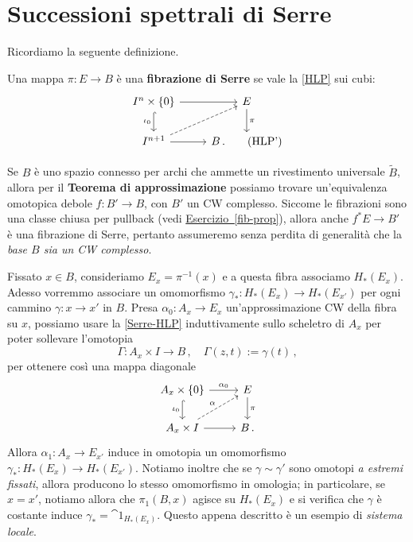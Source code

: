 \section{Successioni spettrali di Serre}

Ricordiamo la seguente definizione.

\begin{df}
	Una mappa $\pi : E \to B$ è una \textbf{fibrazione di Serre} se
	vale la \eqref{HLP} sui cubi:
	\begin{equation}\label{Serre-HLP}
		\begin{tikzcd}
			I^{n} \times \{0\} \ar[r] \ar[d, "\iota_{0}"', hook] & E \ar[d, "\pi"] \\
			I^{n+1} \ar[r] \ar[ur, dashed] & B\,. \tag{HLP'}
		\end{tikzcd}
	\end{equation}
\end{df}

Se $B$ è uno spazio connesso per archi che ammette un rivestimento universale $\widetilde{B}$,
allora per il \textbf{Teorema di approssimazione} possiamo trovare un'equivalenza
omotopica debole $f: B' \to B$, con $B'$ un CW complesso. Siccome le fibrazioni
sono una classe chiusa per pullback (vedi \hyperref[fib-prop]{Esercizio~\ref{fib-prop}}), 
allora anche $f^{*}E \to B'$ 
è una fibrazione di Serre, pertanto assumeremo 
senza perdita di generalità che la \emph{base $B$ sia un CW complesso}.

Fissato $x \in B$, consideriamo  $E_{x} = \pi^{-1}(x)$ e
a questa fibra associamo $H_{*}(E_{x})$. 
Adesso vorremmo associare un omomorfismo 
$\gamma_{*} : H_{*}(E_{x}) \to H_{*}(E_{x'})$
per ogni cammino
$\gamma : x \to x'$ in $B$. 
Presa $\alpha_{0} : A_{x} \to E_{x}$ un'approssimazione CW della fibra su $x$,
possiamo usare la \eqref{Serre-HLP} induttivamente sullo scheletro di $A_{x}$
per poter sollevare l'omotopia 
\begin{equation*}
	\Gamma: A_{x} \times I \longrightarrow B\,, \quad
	\Gamma(z,t) := \gamma(t)\,,
\end{equation*}
per ottenere così una mappa diagonale
\begin{equation*}
	\begin{tikzcd}
		A_{x} \times \{0\} \ar[r, "\alpha_{0}"] \ar[d, "\iota_{0}"', hook] & E \ar[d, "\pi"] \\
		A_{x} \times I \ar[r] \ar[ur, dashed, "\alpha"] & B\,. 
	\end{tikzcd}
\end{equation*}
Allora $\alpha_{1} :A_{x} \to E_{x'}$ induce in omotopia un omomorfismo
$\gamma_{*} : H_{*}(E_{x}) \to H_{*}(E_{x'})$.
Notiamo inoltre che se $\gamma \sim \gamma'$ sono omotopi \emph{a estremi fissati},
allora producono lo stesso omomorfismo in omologia; in particolare,
se $x=x'$, notiamo allora che $\pi_{1}(B,x)$ agisce su
$H_{*}(E_{x})$ e si verifica che $\gamma$ è costante induce $\gamma_{*} = \cat{1}_{H_{*}(E_{x})}$.
Questo appena descritto è un esempio di \emph{sistema locale}.

